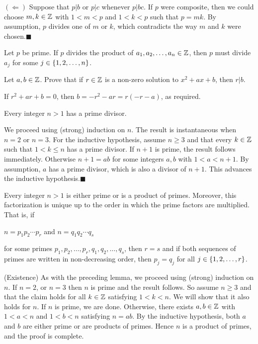 \documentclass[11pt,fleqn,dvipsnames,usenames]{article}
\newcommand{\p}{\noindent}
\newcommand{\ENDPRF}{\hfill $\blacksquare$}
\begin{document}
\p $(\Leftarrow)$ Suppose that $p|b$ or $p|c$ whenever $p|bc$.  If $p$ were composite, then we could choose $m,k\in\mathbb{Z}$ with $1 < m < p$ and $1 < k < p$ such that $p = mk$.  By assumption, $p$ divides one of $m$ or $k$, which contradicts the way $m$ and $k$ were chosen.\ENDPRF
\vsp

\crlry Let $p$ be prime.  If $p$ divides the product of $a_{1},a_{2},\ldots, a_{n}\in\mathbb{Z}$, then $p$ must divide $a_{j}$ for some $j\in\left\{1,2,\ldots, n\right\}$.
\vsp

\begin{example}
Let $a,b\in\mathbb{Z}$.  Prove that if $r\in\mathbb{Z}$ is a non-zero solution to $x^2 + ax + b$, then $r|b$.
\end{example}

\solution If $r^2 + ar + b = 0$, then $b = -r^2 - ar = r(-r - a)$, as required.
\vsp

\lema Every integer $n > 1$ has a prime divisor.
\vsp

\prf We proceed using (strong) induction on $n$.  The result is instantaneous when $n=2$ or $n=3$.
For the inductive hypothesis, assume $n\geq 3$ and that every $k\in \mathbb{Z}$ such that $1 < k \leq n$ has a prime divisor.  If $n+1$ is prime, the result follows immediately.  Otherwise $n+1 = ab$ for some integers $a,b$ with $1 < a < n+1$.  By assumption, $a$ has a prime divisor, which is also a divisor of $n+1$.  This advances the inductive hypothesis.\ENDPRF
\vsp

 Every integer $n > 1$ is either prime or is a product of primes.  Moreover, this factorization is unique up to the order in which the prime factors are multiplied.  That is, if
\begin{center}
$n = p_{1}p_{2}\cdots p_{r}$ and $n = q_{1}q_{2}\cdots q_{s}$
\end{center}
for some primes $p_{1},p_{2},\ldots, p_{r},q_{1},q_{2},\ldots,q_{s}$, then $r = s$ and if both sequences of primes are written in non-decreasing order, then $p_{j} = q_{j}$ for all $j\in\left\{1,2,\ldots, r\right\}$.
\vsp

\prf
\vsmsp

\p (Existence) As with the preceding lemma, we proceed using (strong) induction on $n$.  If $n=2$, or $n=3$ then $n$ is prime and the result follows.  So assume $n\geq 3$ and that the claim holds for all $k\in\mathbb{Z}$ satisfying $1 < k < n$.  We will show that it also holds for $n$.  If $n$ is prime, we are done.  Otherwise, there exists $a,b\in\mathbb{Z}$ with $1 < a < n$ and $1 < b < n$ satisfying $n = ab$.  By the inductive hypothesis, both $a$ and $b$ are either prime or are products of primes.  Hence $n$ is a product of primes, and the proof is complete.
\vsp
\end{document}
